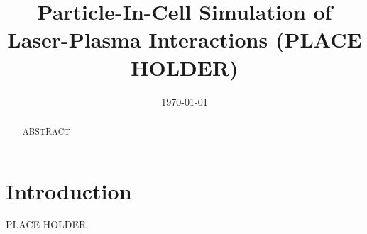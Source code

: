 \documentclass[letter,10pt]{article}
\title{Particle-In-Cell Simulation of Laser-Plasma Interactions (PLACE HOLDER)}
\author{Brian Albright \and \and Kevin Barker \and Ben Bergen \and Kevin Bowers \and Darren Kerbyson \and Lin Yin}
\date{\today}
\begin{document}
\maketitle
\thispagestyle{empty}

\begin{abstract}
ABSTRACT
\end{abstract}

\section*{Introduction}
PLACE HOLDER




\end{document}
